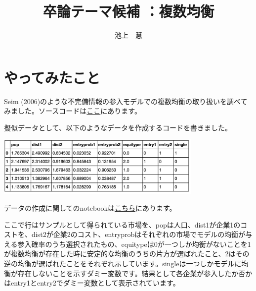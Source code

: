 \documentclass{jsarticle}
\begin{document}
\title{卒論テーマ候補 ：複数均衡}
\author{池上　慧}
\maketitle

\section{やってみたこと}
Seim (2006)のような不完備情報の参入モデルでの複数均衡の取り扱いを調べてみました。ソースコードは\href{https://github.com/keiikegami/multiplicity}{ここ}にあります。

擬似データとして、以下のようなデータを作成するコードを書きました。
\begin{center}
\includegraphics[width=10cm]{table1.png}
\end{center}
データの作成に関してのnotebookは\href{https://github.com/keiikegami/multiplicity/blob/master/sample_data_generation.ipynb}{こちら}にあります。

ここで行はサンプルとして得られている市場を、popは人口、dist1が企業1のコストを、dist2が企業2のコスト、entryprobはそれぞれの市場でモデルの均衡が与える参入確率のうち選択されたもの、equitypeは0が一つしか均衡がないことを1が複数均衡が存在した時に安定的な均衡のうちの片方が選ばれたこと、2はその逆の均衡が選ばれたことをそれぞれ示しています。singleは一つしかモデルに均衡が存在しないことを示すダミー変数です。結果として各企業が参入したか否かはentry1とentry2でダミー変数として表示されています。
\end{document}
